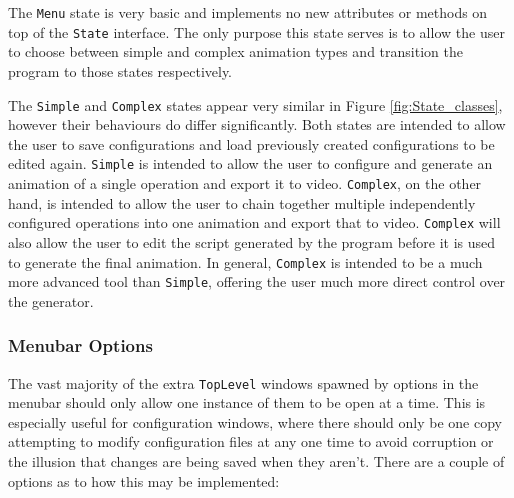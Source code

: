 \documentclass{report}
\begin{document}
The \texttt{Menu} state is very basic and implements no new attributes or
methods on top of the \texttt{State} interface. The only purpose this state
serves is to allow the user to choose between simple and complex animation
types and transition the program to those states respectively.

The \texttt{Simple} and \texttt{Complex} states appear very similar in Figure
\ref{fig:State_classes}, however their behaviours do differ significantly.
Both states are intended to allow the user to save configurations and load
previously created configurations to be edited again. \texttt{Simple} is
intended to allow the user to configure and generate an animation of a single
operation and export it to video. \texttt{Complex}, on the other hand, is
intended to allow the user to chain together multiple independently configured
operations into one animation and export that to video. \texttt{Complex} will
also allow the user to edit the script generated by the program before it is
used to generate the final animation. In general, \texttt{Complex} is intended
to be a much more advanced tool than \texttt{Simple}, offering the user much
more direct control over the generator.

\subsubsection{Menubar Options}
The vast majority of the extra \texttt{TopLevel} windows spawned by options in
the menubar should only allow one instance of them to be open at a time. This
is especially useful for configuration windows, where there should only be one
copy attempting to modify configuration files at any one time to avoid
corruption or the illusion that changes are being saved when they aren't. There
are a couple of options as to how this may be implemented:
\end{document}
